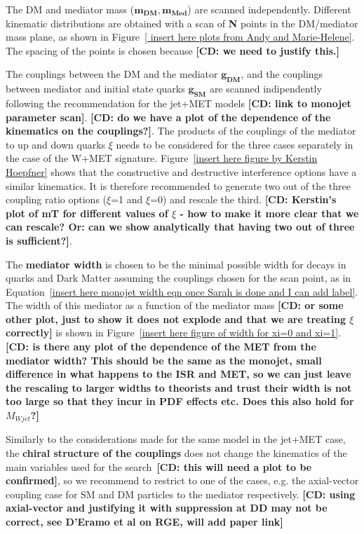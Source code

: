 The DM and mediator mass ($\mathbf{m_{DM},m_{Med}}$) are scanned independently. 
Different kinematic distributions are obtained with a scan of 
\textbf{N} points in the DM/mediator mass plane, as shown in Figure~\ref{
insert here plots from Andy and Marie-Helene}. The spacing
of the points is chosen because \textbf{[CD: we need to justify this.]}

The couplings between the DM and the mediator $\mathbf{g_{DM}}$, and the couplings
between mediator and initial state quarks $\mathbf{g_{SM}}$ are scanned indipendently
following the recommendation for the jet+MET models
\textbf{[CD: link to monojet parameter scan]}. 
\textbf{[CD: do we have a plot of the dependence of the kinematics on the couplings?]}. 
The products of the couplings of the mediator to up and down quarks $\xi$ needs to be considered
for the three cases separately in the case of the W+MET signature. 
Figure~\ref{insert here figure by Kerstin Hoepfner} shows that
the constructive and destructive interference options have 
a similar kinematics. It is therefore recommended to generate 
two out of the three coupling ratio options ($\xi$=1 and $\xi$=0) and rescale 
the third. 
\textbf{[CD: Kerstin's plot of mT for different values of $\xi$ - 
how to make it more clear that we can rescale?
Or: can we show analytically that having two out of three is sufficient?]}. 

The \textbf{mediator width} is chosen to be the minimal possible width
for decays in quarks and Dark Matter assuming the couplings chosen
for the scan point, as in Equation~\ref{insert here monojet width eqn once Sarah is done and I can add label}. 
The width of this mediator as a function of the mediator mass 
\textbf{[CD: or some other plot, just to show it does not explode 
and that we are treating $\xi$ correctly]} is shown in Figure~\ref{insert here
figure of width for xi=0 and xi=1}. \textbf{[CD: is there any plot
of the dependence of the MET from the mediator width? This should be the same as the 
monojet, small difference in what happens to the ISR and MET, so we can just leave
the rescaling to larger widths to theorists and trust their width is not too large
so that they incur in PDF effects etc. Does this also hold for $M_{Wjet}$?]}

Similarly to the considerations made for the same model in the jet+MET case, 
the \textbf{chiral structure of the couplings}
does not change the kinematics of the main variables used for the 
search~\textbf{[CD: this will need a plot to be confirmed]}, 
so we recommend to restrict to one of the cases, e.g. the axial-vector coupling case for
SM and DM particles to the mediator respectively. 
\textbf{[CD: using axial-vector and justifying it with suppression at DD may not be
correct, see D'Eramo et al on RGE, will add paper link]}

